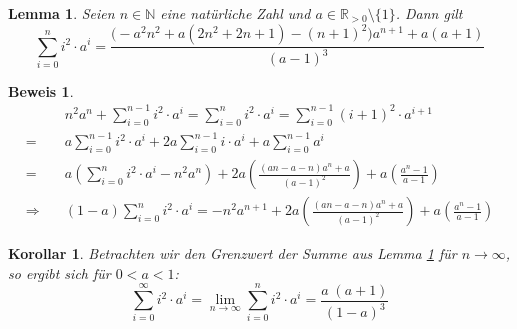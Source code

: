 \documentclass[a4paper]{article}
\newtheorem{korollar}[satz]{Korollar}
\newtheorem{lemma}[satz]{Lemma}
\theoremstyle{nonumberplain}
\newtheorem{beweis}{Beweis}
\begin{document}
	\begin{lemma} \label{lem-infqsum}
		Seien $n \in \mathbb{N}$ eine natürliche Zahl und $a \in \mathbb{R}_{>0}\setminus\{1\}$. Dann gilt
		\begin{equation}
		\sum_{i=0}^{n}{i^2\cdot a^i} = \frac{\big(-a^2n^2 + a(2n^2 + 2n + 1) - (n+1)^2\big)a^{n+1}+a(a+1)}{(a-1)^3}
		\end{equation}
	\end{lemma}
	\begin{beweis}
		\begin{align*}
		& n^2a^n + \sum_{i=0}^{n-1}{i^2\cdot a^i} = \sum_{i=0}^{n}{i^2\cdot a^i} = \sum_{i=0}^{n-1}{(i+1)^2\cdot a^{i+1}} \\
		=& a \sum_{i=0}^{n-1}{i^2\cdot a^{i}} + 2a \sum_{i=0}^{n-1}{i\cdot a^{i}} + a \sum_{i=0}^{n-1}{ a^{i}} \\
		=& a \left(\sum_{i=0}^{n}{i^2\cdot a^i} - n^2a^n \right) + 2a \left(\frac{(an-a-n)a^{n}+a}{(a-1)^2} \right) + a \left( \frac{a^{n}-1}{a-1} \right) \\
		\Rightarrow \quad & (1-a) \sum_{i=0}^{n}{i^2\cdot a^i} = -n^2a^{n+1} + 2a \left(\frac{(an-a-n)a^{n}+a}{(a-1)^2} \right) + a \left( \frac{a^{n}-1}{a-1} \right)
		\end{align*}
	\end{beweis}
	\begin{korollar} \label{kor-infqsum}
		Betrachten wir den Grenzwert der Summe aus Lemma \ref{lem-infqsum} für $n \to \infty$, so ergibt sich für $0<a<1$:
		\begin{equation}
		\sum_{i=0}^{\infty}{i^2\cdot a^i}
		= \lim\limits_{n \to \infty} \sum_{i=0}^{n}{i^2\cdot a^i}
		= \frac{a\;(a+1)}{(1-a)^3}
		\end{equation}	
	\end{korollar}
	
	\printbibliography
	
\end{document}
